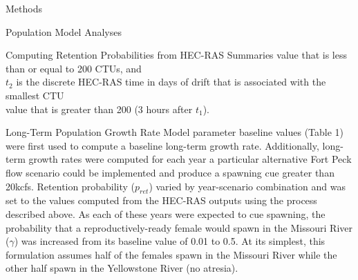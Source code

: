 \documentclass[12pt]{article}
\begin{document}
\begin{section}{Methods}
\begin{subsection}{Population Model Analyses}
\begin{subsubsection}{Computing Retention Probabilities from HEC-RAS Summaries}
\hspace*{1.5cm}value that is less than or equal to 200 CTUs, and\\
\hspace*{0.5cm}$t_2$ is the discrete HEC-RAS time in days of drift that is associated with the smallest CTU\\
\hspace*{1.5cm}value that is greater than 200 (3 hours after $t_1$).\\
\end{subsubsection}

\begin{subsubsection}{Long-Term Population Growth Rate}
Model parameter baseline values (Table 1) were first used to compute a baseline long-term growth rate.  Additionally, long-term growth rates were computed for each year a particular alternative Fort Peck flow scenario could be implemented and produce a spawning cue greater than 20kcfs.  Retention probability ($p_{ret}$) varied by year-scenario combination and was set to the values computed from the HEC-RAS outputs using the process described above.  As each of these years were expected to cue spawning, the probability that a reproductively-ready female would spawn in the Missouri River ($\gamma$) was increased from its baseline value of 0.01 to 0.5.  At its simplest, this formulation assumes half of the females spawn in the Missouri River while the other half spawn in the Yellowstone River (no atresia).
\end{subsubsection}


\end{subsection}
\end{section}
\end{document}
